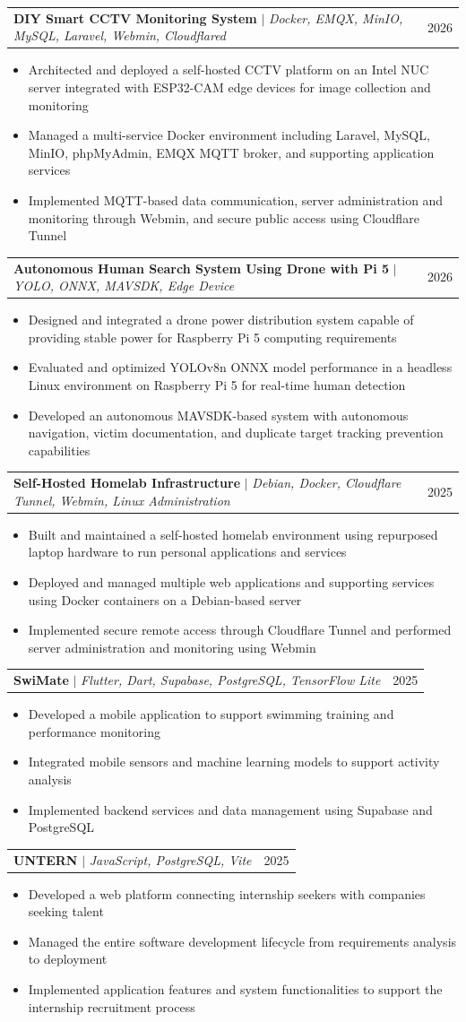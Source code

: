 \documentclass[letterpaper,11pt]{article}
\makeatletter
\newcommand{\resumeItem}[1]{
	\item\small{
		{#1 \vspace{-2pt}}
	}
}
\newcommand{\resumeProjectHeading}[2]{
	\item
	\begin{tabular*}{0.97\textwidth}{l@{\extracolsep{\fill}}r}
		\small#1 & #2 \\
	\end{tabular*}\vspace{-7pt}
}
\newcommand{\resumeItemListStart}{\begin{itemize}}
\newcommand{\resumeItemListEnd}{\end{itemize}\vspace{-5pt}}
\makeatother
\begin{document}
	\resumeProjectHeading
	{\textbf{DIY Smart CCTV Monitoring System} $|$ \emph{Docker, EMQX, MinIO, MySQL, Laravel, Webmin, Cloudflared}}{2026}
	\resumeItemListStart
	\resumeItem{Architected and deployed a self-hosted CCTV platform on an Intel NUC server integrated with ESP32-CAM edge devices for image collection and monitoring}
	\resumeItem{Managed a multi-service Docker environment including Laravel, MySQL, MinIO, phpMyAdmin, EMQX MQTT broker, and supporting application services}
	\resumeItem{Implemented MQTT-based data communication, server administration and monitoring through Webmin, and secure public access using Cloudflare Tunnel}
	\resumeItemListEnd
	
	\resumeProjectHeading
	{\textbf{Autonomous Human Search System Using Drone with Pi 5} $|$ \emph{YOLO, ONNX, MAVSDK, Edge Device}}{2026}
	\resumeItemListStart
	\resumeItem{Designed and integrated a drone power distribution system capable of providing stable power for Raspberry Pi 5 computing requirements}
	\resumeItem{Evaluated and optimized YOLOv8n ONNX model performance in a headless Linux environment on Raspberry Pi 5 for real-time human detection}
	\resumeItem{Developed an autonomous MAVSDK-based system with autonomous navigation, victim documentation, and duplicate target tracking prevention capabilities}
	\resumeItemListEnd
	
	\resumeProjectHeading
	{\textbf{Self-Hosted Homelab Infrastructure} $|$ \emph{Debian, Docker, Cloudflare Tunnel, Webmin, Linux Administration}}{2025}
	\resumeItemListStart
	\resumeItem{Built and maintained a self-hosted homelab environment using repurposed laptop hardware to run personal applications and services}
	\resumeItem{Deployed and managed multiple web applications and supporting services using Docker containers on a Debian-based server}
	\resumeItem{Implemented secure remote access through Cloudflare Tunnel and performed server administration and monitoring using Webmin}
	\resumeItemListEnd
	
	\resumeProjectHeading
	{\textbf{SwiMate} $|$ \emph{Flutter, Dart, Supabase, PostgreSQL, TensorFlow Lite}}{2025}
	\resumeItemListStart
	\resumeItem{Developed a mobile application to support swimming training and performance monitoring}
	\resumeItem{Integrated mobile sensors and machine learning models to support activity analysis}
	\resumeItem{Implemented backend services and data management using Supabase and PostgreSQL}
	\resumeItemListEnd
	
	\resumeProjectHeading
	{\textbf{UNTERN} $|$ \emph{JavaScript, PostgreSQL, Vite}}{2025}
	\resumeItemListStart
	\resumeItem{Developed a web platform connecting internship seekers with companies seeking talent}
	\resumeItem{Managed the entire software development lifecycle from requirements analysis to deployment}
	\resumeItem{Implemented application features and system functionalities to support the internship recruitment process}
	\resumeItemListEnd
	
\end{document}
